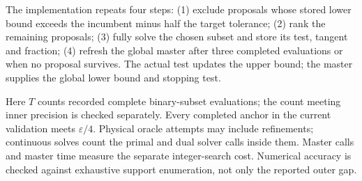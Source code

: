\documentclass[11pt,a4paper]{article}
\begin{document}
The implementation repeats four steps: (1) exclude proposals whose stored lower bound exceeds the incumbent minus half the target tolerance; (2) rank the remaining proposals; (3) fully solve the chosen subset and store its test, tangent and fraction; (4) refresh the global master after three completed evaluations or when no proposal survives. The actual test updates the upper bound; the master supplies the global lower bound and stopping test.

Here $T$ counts recorded complete binary-subset evaluations; the count meeting inner precision is checked separately. Every completed anchor in the current validation meets $\varepsilon/4$. Physical oracle attempts may include refinements; continuous solves count the primal and dual solver calls inside them. Master calls and master time measure the separate integer-search cost. Numerical accuracy is checked against exhaustive support enumeration, not only the reported outer gap.
\end{document}
